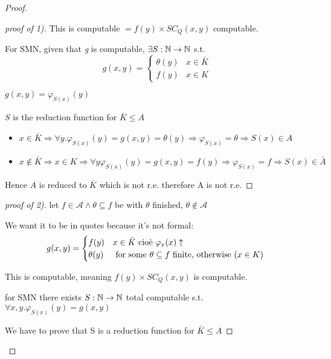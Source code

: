 \begin{theorem}
\begin{proof}
\begin{proof}[proof of 1)]
    This is computable $ = f(y) \times SC_Q(x,y) $ computable.

    For SMN, given that \textit{g} is computable, $ \exists
    S:\mathbb{N}\rightarrow\mathbb{N} $ s.t.
    \begin{equation*}
      g(x,y) = \begin{cases}
        \theta(y) & x \in \bar{K} \\
        f(y) & x \in K
      \end{cases}
    \end{equation*}

    $ g(x,y) = \varphi_{S(x)}(y)$

    $S$ is the reduction function for $ \bar{K}\leq A $

    \begin{itemize}
    \item $ x\in\bar{K} \Rightarrow \forall y. \varphi_{S(x)}(y) = g(x,y) =
      \theta(y) \Rightarrow \varphi_{S(x)} = \theta \Rightarrow S(x) \in A $
    \item $ x\not\in\bar{K}\Rightarrow x\in K\Rightarrow\forall
      y\varphi_{S(x)}(y) = g(x,y)=f(y)\Rightarrow\varphi_{S(x)}=f\Rightarrow
      S(x)\in\bar{A}$
    \end{itemize}

    Hence $A$ is reduced to $ \bar{K} $ which is not r.e. therefore A is
    not r.e.

  \end{proof}

  \begin{proof}[proof of 2)]
    let $ f\in\mathcal{A}\land\theta\subseteq f $ be with $ \theta $
    finished, $ \theta\not\in\mathcal{A} $

    We want it to be in quotes because it's not formal: \begin{equation*}
      g(x,y) = \begin{cases}
        f(y) & x \in\bar{K} $ cioè $ \varphi_x(x)\uparrow \\
        \theta(y) & $ for some $ \theta\subseteq f $ finite, otherwise ($ x\in K $) $
      \end{cases}
    \end{equation*}

    This is computable, meaning $f(y) \times SC_Q(x,y) $ is
    computable.

    for SMN there exists $ S:\mathbb{N}\rightarrow\mathbb{N} $ total computable s.t. $
    \forall x,y. \varphi_{S(x)}(y) = g(x,y) $

    We have to prove that S is a reduction function for $ \bar{K}\leq A $


\end{proof}
\end{proof}
\end{theorem}
